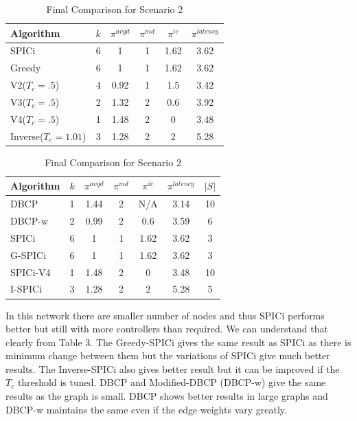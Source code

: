 \documentclass[8pt]{extarticle}
\begin{document}
	\begin{table}
		\caption{SPICi variations for Scenario 2}
		\begin{center}
			\begin{tabular}{|l|c|c|c|c|c|}
				\hline
				\textbf{Algorithm} & \textbf{$k$} & $\pi^{avgd}$ & \textbf{$\pi^{md}$} & \textbf{$\pi^{ic}$} & \textbf{$\pi^{latency}$} \\
				\hline
				SPICi & 6 & 1 & 1 & 1.62 & 3.62 \\
				Greedy & 6 & 1 & 1 & 1.62 & 3.62 \\
				V2($T_c=.5$) & 4 & 0.92 & 1 & 1.5 & 3.42 \\
				V3($T_c=.5$) & 2 & 1.32 & 2 & 0.6 & 3.92 \\
				V4($T_c=.5$) & 1 & 1.48 & 2 & 0 & 3.48 \\
				Inverse($T_c=1.01$) & 3 & 1.28 & 2 & 2 & 5.28 \\
				\hline
			\end{tabular}
		\end{center}
		\caption{Final Comparison for Scenario 2}
		\begin{center}
			\begin{tabular}{|l|c|c|c|c|c|c|}
				\hline
				\textbf{Algorithm} & \textbf{$k$} & $\pi^{avgd}$ & \textbf{$\pi^{md}$} & \textbf{$\pi^{ic}$} & \textbf{$\pi^{latency}$} & \textbf{$|S|$} \\
				\hline
				DBCP & 1 & 1.44 & 2 & N/A & 3.14 & 10 \\
				DBCP-w & 2 & 0.99 & 2 & 0.6 & 3.59 & 6 \\
				SPICi & 6 & 1 & 1 & 1.62 & 3.62 & 3 \\
				G-SPICi & 6 & 1 & 1 & 1.62 & 3.62 & 3 \\
				SPICi-V4 & 1 & 1.48 & 2 & 0 & 3.48 & 10 \\
				I-SPICi & 3 & 1.28 & 2 & 2 & 5.28 & 5 \\
				\hline
			\end{tabular}
		\end{center}
	\end{table}

	In this network there are smaller number of nodes and thus SPICi performs better but still with more controllers than required. We can understand that clearly from Table 3. The Greedy-SPICi gives the same result as SPICi as there is minimum change between them but the variations of SPICi give much better results. The Inverse-SPICi also gives better result but it can be improved if the $T_c$ threshold is tuned.
	DBCP and Modified-DBCP (DBCP-w) give the same results as the graph is small. DBCP shows better results in large graphs and DBCP-w maintains the same even if the edge weights vary greatly.
	
\end{document}
